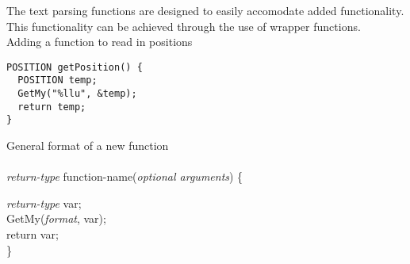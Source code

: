 \documentclass[11pt]{article}
\begin{document}
The text parsing functions are designed to easily accomodate added functionality. This functionality can be achieved through the use of wrapper functions. \\
Adding a function to read in positions

\begin{verbatim}
POSITION getPosition() {
  POSITION temp;
  GetMy("%llu", &temp);
  return temp;
}
\end{verbatim}
General format of a new function\\\\
\textit{return-type} function-name({\textit{optional arguments}}) \{

\textit{return-type} var; \\

GetMy(\textit{format}, var); \\

return var; \\
\}
\end{document}
